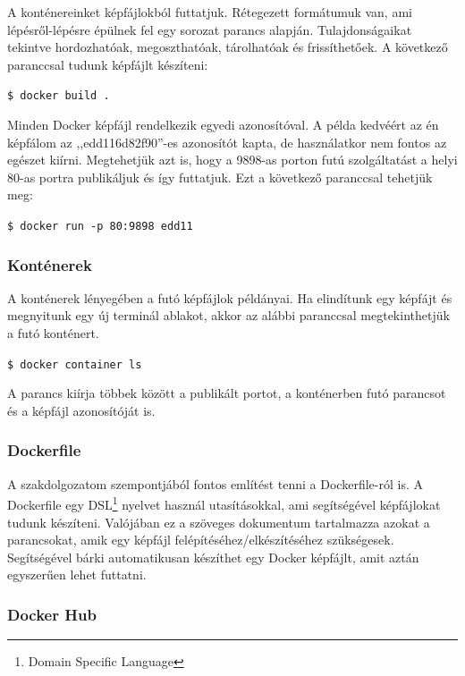 \documentclass{thesis-ekf}
\theoremstyle{definition}
\theoremstyle{remark}
\begin{document}
A konténereinket képfájlokból futtatjuk.
Rétegezett formátumuk van, ami lépésről-lépésre épülnek fel egy sorozat parancs alapján.
Tulajdonságaikat tekintve hordozhatóak, megoszthatóak, tárolhatóak és frissíthetőek.
A következő paranccsal tudunk képfájlt készíteni:

\begin{center}
	\texttt{\$ docker build .}
\end{center}

Minden Docker képfájl rendelkezik egyedi azonosítóval.
A példa kedvéért az én képfálom az ,,edd116d82f90''-es azonosítót kapta, de használatkor nem fontos az egészet kiírni.
Megtehetjük azt is, hogy a 9898-as porton futú szolgáltatást a helyi 80-as portra publikáljuk és így futtatjuk.
Ezt a következő paranccsal tehetjük meg:

\begin{center}
	\texttt{\$ docker run -p 80:9898 edd11}
\end{center}

\subsubsection{Konténerek}

A konténerek lényegében a futó képfájlok példányai.
Ha elindítunk egy képfájt és megnyitunk egy új terminál ablakot, akkor az alábbi paranccsal megtekinthetjük a futó konténert.

\begin{center}
	\texttt{\$ docker container ls}
\end{center}

A parancs kiírja többek között a publikált portot, a konténerben futó parancsot és a képfájl azonosítóját is.

\subsubsection{Dockerfile}

A szakdolgozatom szempontjából fontos említést tenni a Dockerfile-ról is.
A Dockerfile egy DSL\footnote{Domain Specific Language} nyelvet használ utasításokkal, ami segítségével képfájlokat tudunk készíteni.
Valójában ez a szöveges dokumentum tartalmazza azokat a parancsokat, amik egy képfájl felépítéséhez/elkészítéséhez szükségesek.
Segítségével bárki automatikusan készíthet egy Docker képfájlt, amit aztán egyszerűen lehet futtatni.

\subsubsection{Docker Hub}
\end{document}
